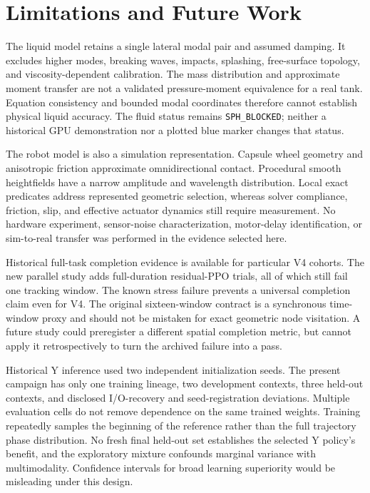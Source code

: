 \section{Limitations and Future Work}
The liquid model retains a single lateral modal pair and assumed damping. It excludes higher modes, breaking waves, impacts, splashing, free-surface topology, and viscosity-dependent calibration. The mass distribution and approximate moment transfer are not a validated pressure-moment equivalence for a real tank. Equation consistency and bounded modal coordinates therefore cannot establish physical liquid accuracy. The fluid status remains \texttt{SPH\_BLOCKED}; neither a historical GPU demonstration nor a plotted blue marker changes that status.

The robot model is also a simulation representation. Capsule wheel geometry and anisotropic friction approximate omnidirectional contact. Procedural smooth heightfields have a narrow amplitude and wavelength distribution. Local exact predicates address represented geometric selection, whereas solver compliance, friction, slip, and effective actuator dynamics still require measurement. No hardware experiment, sensor-noise characterization, motor-delay identification, or sim-to-real transfer was performed in the evidence selected here.

Historical full-task completion evidence is available for particular V4 cohorts. The new parallel study adds full-duration residual-PPO trials, all of which still fail one tracking window. The known stress failure prevents a universal completion claim even for V4. The original sixteen-window contract is a synchronous time-window proxy and should not be mistaken for exact geometric node visitation. A future study could preregister a different spatial completion metric, but cannot apply it retrospectively to turn the archived failure into a pass.

Historical Y inference used two independent initialization seeds. The present campaign has only one training lineage, two development contexts, three held-out contexts, and disclosed I/O-recovery and seed-registration deviations. Multiple evaluation cells do not remove dependence on the same trained weights. Training repeatedly samples the beginning of the reference rather than the full trajectory phase distribution. No fresh final held-out set establishes the selected Y policy's benefit, and the exploratory mixture confounds marginal variance with multimodality. Confidence intervals for broad learning superiority would be misleading under this design.

